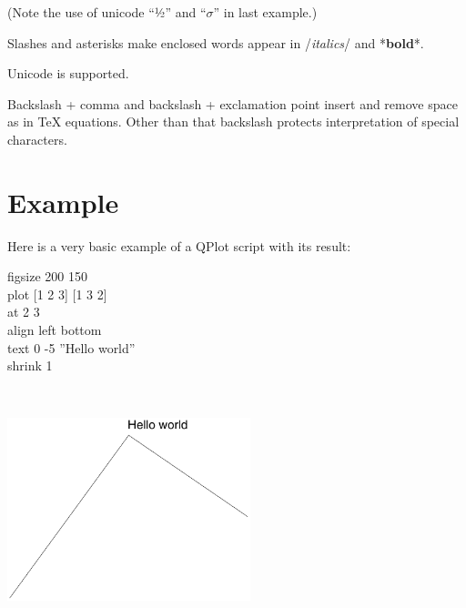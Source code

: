 \documentclass[11pt]{article}
\begin{document}
\noindent (Note the use of unicode ``½'' and ``$\sigma$'' in last example.)

Slashes and asterisks make enclosed words appear in /\emph{italics}/
and *{\bf bold}*.

Unicode is supported.

Backslash + comma and backslash + exclamation point insert and remove
space as in TeX equations. Other than that backslash protects
interpretation of special characters.

\section{Example}

Here is a very basic example of a QPlot script with its result:\medskip

\begin{centering}\noindent%
\begin{minipage}[b]{.3\textwidth}
figsize 200 150\\
plot [1 2 3] [1 3 2]\\
at 2 3\\
align left bottom\\
text 0 -5 ''Hello world''\\
shrink 1
\end{minipage}
~
~
\begin{minipage}[b]{.45\textwidth}
\includegraphics[width=200pt]{directuse-eg}
\end{minipage}

\end{centering}
\medskip

  
\end{document}
